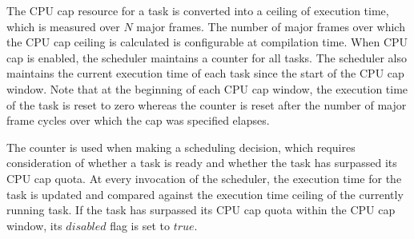 

\iffalse
The CPU cap resource for a task is converted into a ceiling of
execution time, which is measured over $N$ major frames. The number
of major frames over which the CPU cap ceiling is calculated is
configurable at compilation time. When CPU cap is enabled, the
scheduler maintains a counter for all tasks. The scheduler also
maintains the current execution time of each task since the start of
the CPU cap window. Note that at the beginning of each CPU cap
window, the execution time of the task is reset to zero whereas the
counter is reset after the number of major frame cycles over which
the cap was specified elapses. 

The counter is used when making a scheduling decision, which requires
consideration of whether a task is ready and whether the task has
surpassed its CPU cap quota.  At every invocation of the scheduler,
the execution time for the task is updated and compared against the
execution time ceiling of the currently running task. If the task
has surpassed its CPU cap quota within the CPU cap window, its
$disabled$ flag is set to $true$.  

